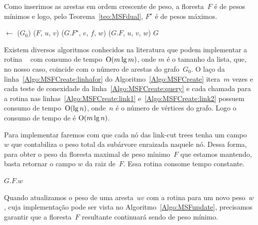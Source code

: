 Como inserimos as arestas em ordem crescente de peso, a floresta~$F$ é de pesos mínimos e logo, pelo Teorema~\ref{teo:MSFdual}, $F^\star$ é de pesos máximos.

\begin{algorithm}[htb]
\caption{\MSFCreate($n$, $G_0$)}
\label{Algo:MSFCreate}
\begin{algorithmic}[1]
\State {} $\gets$ \order($G_0$)
\label{Algo:MSFCreate:linhafor}
\If \linkcutQuery($F$, $u$, $v$)\label{Algo:MSFCreate:query}
\State \linkcutAddEdge($G$.$F^\star$, $e$, $f$, $w$)\label{Algo:MSFCreate:link1}
\Else
\State \linkcutAddEdge($G$.$F$, $u$, $v$, $w$)\label{Algo:MSFCreate:link2}
\EndIf
\EndFor
\State \Return $G$
\end{algorithmic}
\end{algorithm}

Existem diversos algoritmos conhecidos na literatura que podem implementar a rotina \order{}~\cite{CLRS} com consumo de tempo~$\mathrm{O}(m\lg m)$, onde $m$ é o tamanho da lista,
que, no nosso caso, coincide com o número de arestas do grafo~$G_0$.
O laço da linha~\ref{Algo:MSFCreate:linhafor} do Algoritmo~\ref{Algo:MSFCreate} itera~$m$ vezes e cada teste de conexidade da linha~\ref{Algo:MSFCreate:query} e cada chamada para a rotina  \linkcutAddEdge{} nas linhas~\ref{Algo:MSFCreate:link1} e~\ref{Algo:MSFCreate:link2} possuem consumo de tempo~$\mathrm{O}(\lg n)$, onde~$n$ é o número de vértices do grafo.
Logo o consumo de tempo de \MSFCreate{} é $\mathrm{O}(m\lg n)$.

Para implementar \MSFweight{} faremos com que cada nó das link-cut trees tenha um campo~$w$ que contabiliza o peso total da subárvore enraizada naquele nó.
Dessa forma, para obter o peso da floresta maximal de peso mínimo~$F$ que estamos mantendo, basta retornar o campo $w$ da raiz de~$F$.
Essa rotina consome tempo constante.

\begin{algorithm}[htb]
\caption{\MSFweight($G$)}
\label{Algo:MSFweight}
\begin{algorithmic}[1]
\State \Return $G$.$F$.$w$
\end{algorithmic}
\end{algorithm}

Quando atualizamos o peso de uma aresta~$uv$ com a rotina \MSFupdate{} para um novo peso~$w$, cuja implementação pode ser vista no Algoritmo~\ref{Algo:MSFupdate}, precisamos garantir que a floresta~$F$ resultante continuará sendo  de peso mínimo.

